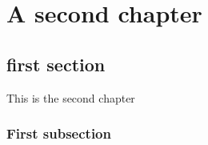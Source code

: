 \chapter{A second chapter}
\label{chapter:2}

\section{first section}
This is the second chapter

\subsection{First subsection}
